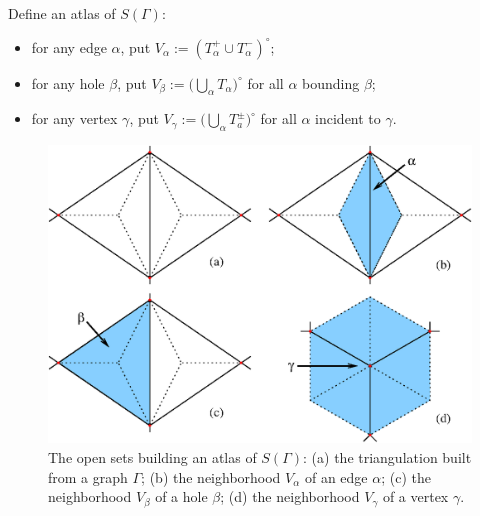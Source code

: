 Define an atlas of $S(\Gamma)$:
\begin{itemize}
\item for any edge $\alpha$, put $V_\alpha := (T_\alpha^+ \cup T_\alpha^-)^\circ$;
\item for any hole $\beta$, put $V_\beta := \bigl( \bigcup_{\alpha} T_\alpha \bigr)^\circ$
  for all $\alpha$ bounding $\beta$;
\item for any vertex $\gamma$, put $V_\gamma := \bigl( \bigcup_\alpha T_a^\pm \bigr)^\circ$
  for all $\alpha$ incident to $\gamma$.
\end{itemize}
\begin{figure}[btp]
  \centering\includegraphics[width=\textwidth]{atlas}
  \caption{The open sets building an atlas of $S(\Gamma)$: (a) the
    triangulation built from a graph $\Gamma$; (b) the neighborhood
    $V_\alpha$ of an edge $\alpha$; (c) the neighborhood $V_\beta$ of a hole
    $\beta$; (d) the neighborhood $V_\gamma$ of a vertex $\gamma$.}
  \label{fig:atlas}
\end{figure}

